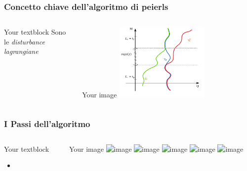 \documentclass{beamer}
\begin{document}
	
	\begin{frame}
		\frametitle{ Concetto chiave dell'algoritmo di peierls}
		  	\begin{columns}[T]
    			\begin{column}{.5\textwidth}
     				\begin{block}{Your textblock}
							Sono le \emph{disturbance lagrangiane}
    				\end{block}
    			\end{column}
    		   	\begin{column}{.5\textwidth}
			    	\begin{block}{Your image}
							\includegraphics[width=0.5\textwidth]{Pictures/AdvRetSol}
    				\end{block}
    			\end{column}
    		\end{columns}
	\end{frame}
	
	
		\begin{frame}
		\frametitle{I Passi dell'algoritmo}
		  	\begin{columns}[T]
    			\begin{column}{.5\textwidth}
     				\begin{block}{Your textblock}
						\begin{itemize}
							\item
						\end{itemize}
    				\end{block}
    			\end{column}
    		   	\begin{column}{.5\textwidth}
			    	\begin{block}{Your image}
								\includegraphics<1>[width=\textwidth]{Pictures/GeometricPicture0}
								\includegraphics<2>[width=\textwidth]{Pictures/GeometricPicture1}
								\includegraphics<3>[width=\textwidth]{Pictures/GeometricPicture2}								
								\includegraphics<4>[width=\textwidth]{Pictures/GeometricPicture3}
								\includegraphics<5>[width=\textwidth]{Pictures/GeometricPictureLinear1}
								
    				\end{block}
    			\end{column}
    		\end{columns}
	\end{frame}
	
\end{document}
